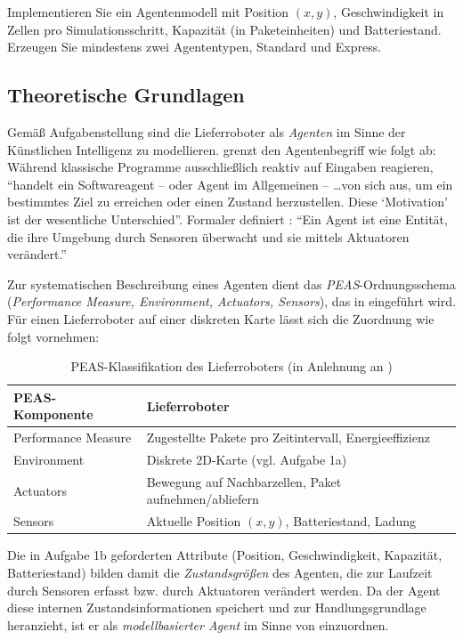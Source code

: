 Implementieren Sie ein Agentenmodell mit Position \((x, y)\), Geschwindigkeit in Zellen pro Simulationsschritt, Kapazität (in Paketeinheiten) und Batteriestand. Erzeugen Sie mindestens zwei Agententypen, Standard und Express.

\subsection{Theoretische Grundlagen}

Gemäß Aufgabenstellung sind die Lieferroboter als \textit{Agenten} im Sinne der Künstlichen Intelligenz zu modellieren. \textcite[S. 7]{5} grenzt den Agentenbegriff wie folgt ab: Während klassische Programme ausschließlich reaktiv auf Eingaben reagieren, \enquote{handelt ein Softwareagent -- oder Agent im Allgemeinen -- \ldots von sich aus, um ein bestimmtes Ziel zu erreichen oder einen Zustand herzustellen. Diese \enquote{Motivation} ist der wesentliche Unterschied}. Formaler definiert \textcite[S. 8]{5}: \enquote{Ein Agent ist eine Entität, die ihre Umgebung durch Sensoren überwacht und sie mittels Aktuatoren verändert.}

Zur systematischen Beschreibung eines Agenten dient das \textit{\acs{PEAS}}-Ordnungsschema (\textit{Performance Measure, Environment, Actuators, Sensors}), das in \textcite[S. 8\,f.]{5} eingeführt wird. Für einen Lieferroboter auf einer diskreten Karte lässt sich die Zuordnung wie folgt vornehmen:

\begin{table}[H]
    \centering
    \begin{tabular}{p{4.5cm} p{9.5cm}}
        \toprule
        \textbf{\acs{PEAS}-Komponente} & \textbf{Lieferroboter} \\
        \midrule
        Performance Measure & Zugestellte Pakete pro Zeitintervall, Energieeffizienz \\
        Environment          & Diskrete 2D-Karte (vgl. Aufgabe 1a) \\
        Actuators            & Bewegung auf Nachbarzellen, Paket aufnehmen/abliefern \\
        Sensors              & Aktuelle Position \((x, y)\), Batteriestand, Ladung \\
        \bottomrule
    \end{tabular}
    \caption{\acs{PEAS}-Klassifikation des Lieferroboters (in Anlehnung an \cite{5})}
    \label{tab:peas_agent_1b}
\end{table}

Die in Aufgabe 1b geforderten Attribute (Position, Geschwindigkeit, Kapazität, Batteriestand) bilden damit die \textit{Zustandsgrößen} des Agenten, die zur Laufzeit durch Sensoren erfasst bzw. durch Aktuatoren verändert werden. Da der Agent diese internen Zustandsinformationen speichert und zur Handlungsgrundlage heranzieht, ist er als \textit{modellbasierter Agent} im Sinne von \textcite[S. 18\,f.]{5} einzuordnen.

